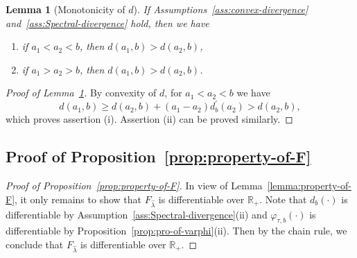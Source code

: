 \documentclass[11pt]{article}
\def\R{\mathbb{R}}
\newtheorem{lemma}{Lemma}
\def\R{\mathbb{R}}
\newcommand{\wh}{\widehat}
\begin{document}
\begin{lemma}[Monotonicity of $d$]\label{lemma:monoton-d}
    If Assumptions~\ref{ass:convex-divergence} and~\ref{ass:Spectral-divergence} hold, then we have 
    \begin{enumerate}[label=(\roman*)]
        \item if $a_1 < a_2 < b$, then $d(a_1,b) > d(a_2,b)$,
        \item if $a_1 > a_2 > b$, then $d(a_1,b) > d(a_2,b)$.
    \end{enumerate}
\end{lemma}
\begin{proof}[Proof of Lemma~\ref{lemma:monoton-d}]
    By convexity of $d$, for $a_1< a_2<b$ we have 
    \[
        d(a_1,b)\geq d(a_2,b) + (a_1-a_2)d_b^\prime(a_2) > d(a_2,b),
    \]
    which proves assertion (i). Assertion (ii) can be proved similarly.
\end{proof}


\subsection{Proof of Proposition~\ref{prop:property-of-F}}



\begin{proof}[Proof of Proposition~\ref{prop:property-of-F}]
    In view of Lemma~\ref{lemma:property-of-F}, it only remains to show that $F_{\wh\lambda}$ is differentiable over $\R_+$. Note that $d_b(\cdot)$ is differentiable by Assumption~\ref{ass:Spectral-divergence}(ii) and $\varphi_{\tau,b}(\cdot)$ is differentiable by Proposition~\ref{prop:pro-of-varphi}(ii). Then by the chain rule, we conclude that $F_{\wh\lambda}$ is differentiable over $\R_+$.
\end{proof}
\end{document}
